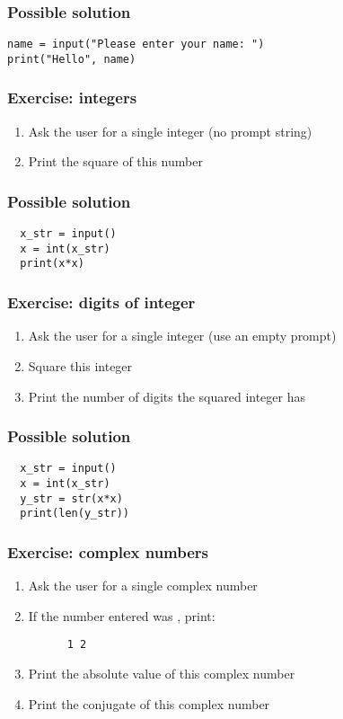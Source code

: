 \documentclass[14pt,compress]{beamer}
\begin{document}
\begin{frame}
\frametitle{Possible solution}
\begin{lstlisting}
name = input("Please enter your name: ")
print("Hello", name)
\end{lstlisting}

\end{frame}

\begin{frame}[plain]
  \frametitle{Exercise: integers}
  \begin{enumerate}
  \item Ask the user for a single integer (no prompt string)
  \item Print the square of this number
  \end{enumerate}
\end{frame}

\begin{frame}
\frametitle{Possible solution}
\begin{lstlisting}
  x_str = input()
  x = int(x_str)
  print(x*x)
\end{lstlisting}

\end{frame}


\begin{frame}[plain]
  \frametitle{Exercise: digits of integer}
  \begin{enumerate}
  \item Ask the user for a single integer (use an empty prompt)
  \item Square this integer
  \item Print the number of digits the squared integer has
  \end{enumerate}
\end{frame}

\begin{frame}
\frametitle{Possible solution}
\begin{lstlisting}
  x_str = input()
  x = int(x_str)
  y_str = str(x*x)
  print(len(y_str))
\end{lstlisting}

\end{frame}

\begin{frame}
  \frametitle{Exercise: complex numbers}
  \begin{enumerate}
  \item Ask the user for a single complex number
  \item If the number entered was , print:
    \begin{lstlisting}
      1 2
    \end{lstlisting}
  \item Print the absolute value of this complex number
  \item Print the conjugate of this complex number
  \end{enumerate}
\end{frame}
\end{document}
